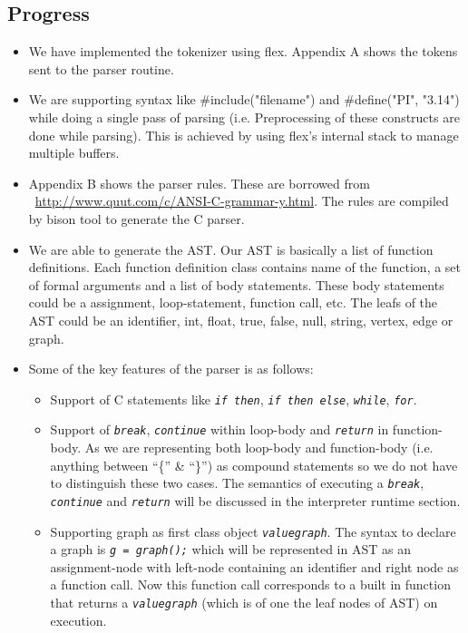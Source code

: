 \documentclass[12,twoside]{article}
\begin{document}
  \subsection{Progress}
  \begin{itemize}
    \item We have implemented the tokenizer using flex. Appendix A shows the 
      tokens sent to the parser routine.
    \item We are supporting syntax like \#include("filename") and \#define("PI", 
        "3.14") while doing a single pass of parsing  (i.e. Preprocessing of 
          these constructs are done while parsing). This is achieved by 
          using flex's internal stack to manage multiple buffers.
    \item Appendix B shows the parser rules. These are borrowed from 
    ~\url{http://www.quut.com/c/ANSI-C-grammar-y.html}. The rules are compiled 
    by bison tool to generate the C parser.

    \item  We are able to generate the AST. Our AST is basically a list of 
    function definitions. Each function definition class contains name of the 
    function, a set of formal arguments and a list of body statements. These 
    body statements could be a assignment, loop-statement, function call, etc.
    The leafs of the AST could be an identifier, int, float, true, false, null, 
    string, vertex, edge or graph.
    \item Some of the key features of the parser is as follows:

    \begin{itemize}
      \item Support of C statements like  {\tt\emph{if then}}, {\tt\emph{if then 
        else}}, {\tt\emph{while}}, {\tt\emph{for}}. 

      \item Support of {\tt\emph{break}}, {\tt\emph{continue}} within loop-body 
        and {\tt\emph{return}} in function-body.
      As we are representing both loop-body and function-body (i.e. anything 
          between ``\{'' \& ``\}'') as compound statements so we do not have to
      distinguish these two cases. The semantics of executing a {\tt\emph{break}}, 
      {\tt\emph{continue}} and {\tt\emph{return}} will be discussed in the 
        interpreter runtime section.

      \item Supporting graph as first class object {\tt\emph{valuegraph}}.
      The syntax to declare a graph is {\tt\emph{g = graph();}} which will be 
      represented in AST as an assignment-node with left-node containing an 
      identifier and right
      node as a function call. Now this function call corresponds to a built in 
      function that returns a {\tt\emph{valuegraph}} (which is of one the leaf 
          nodes of AST) on execution.


\end{itemize}
\end{itemize}
\end{document}
